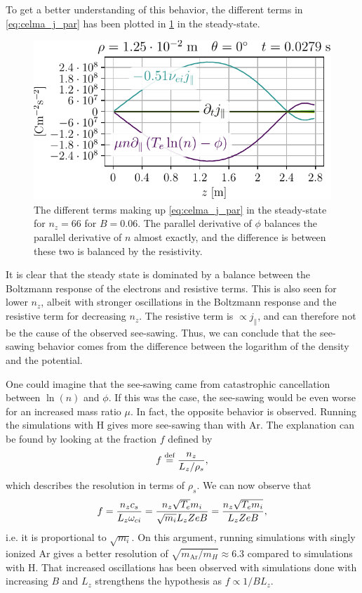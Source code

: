 \noindent
To get a better understanding of this behavior, the different terms in \cref{eq:celma_j_par}  has been plotted in \cref{fig:jParBalance} in the steady-state.
%
\begin{figure}[htb]
    \centering
    \includegraphics{fig/results/jParBalanceNy66}
    \caption{The different terms making up \cref{eq:celma_j_par} in the steady-state for $n_z=66$ for $B=0.06$.
        The parallel derivative of $\phi$ balances the parallel derivative of $n$ almost exactly, and the difference is between these two is balanced by the resistivity.
    }
    \label{fig:jParBalance}
\end{figure}
%
It is clear that the steady state is dominated by a balance between the Boltzmann response of the electrons and resistive terms.
This is also seen for lower $n_z$, albeit with stronger oscillations in the Boltzmann response and the resistive term for decreasing $n_z$.
The resistive term is $\propto j_\|$, and can therefore not be the cause of the observed see-sawing.
Thus, we can conclude that the see-sawing behavior comes from the difference between the logarithm of the density and the potential.

One could imagine that the see-sawing came from catastrophic cancellation between $\ln(n)$ and $\phi$.
If this was the case, the see-sawing would be even worse for an increased mass ratio $\mu$.
In fact, the opposite behavior is observed.
Running the simulations with $\text{H}$ gives more see-sawing than with $\text{Ar}$.
The explanation can be found by looking at the fraction $f$ defined by
%
\begin{align}
    f \overset{\text{def}}{=} \frac{n_z}{L_z/\rho_s},
    \label{eq:defF}
\end{align}
%
which describes the resolution in terms of $\rho_s$.
We can now observe that
%
\begin{align*}
  f = \frac{n_zc_s}{L_z \omega_{ci}}
    = \frac{n_z\sqrt{T_e}m_i}{\sqrt{m_i} L_z ZeB}
    = \frac{n_z\sqrt{T_em_i}}{L_z ZeB},
\end{align*}
%
i.e. it is proportional to $\sqrt{m_i}$.
On this argument, running simulations with singly ionized $\text{Ar}$ gives a better resolution of $\sqrt{m_{\text{Ar}}/m_H}\approx6.3$ compared to simulations with $\text{H}$.
That increased oscillations has been observed with simulations done with increasing $B$ and $L_z$ strengthens the hypothesis as $f\propto 1/BL_z$.

